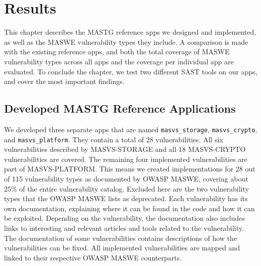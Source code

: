 \chapter{Results}
\label{c:results}

This chapter describes the MASTG reference apps we designed and implemented, as well as the MASWE vulnerability types they include. A comparison is made with the existing reference apps, and both the total coverage of MASWE vulnerability types across all apps and the coverage per individual app are evaluated. To conclude the chapter, we test two different SAST tools on our apps, and cover the most important findings.

\section{Developed MASTG Reference Applications}

We developed three separate apps that are named \texttt{masvs\_storage}, \texttt{masvs\_crypto}, and \texttt{masvs\_platform}. They contain a total of 28 vulnerabilities. All six vulnerabilities described by MASVS-STORAGE and all 18 MASVS-CRYPTO vulnerabilities are covered. The remaining four implemented vulnerabilities are part of MASVS-PLATFORM. This means we created implementations for 28 out of 115 vulnerability types as documented by OWASP MASWE, covering about 25\% of the entire vulnerability catalog. Excluded here are the two vulnerability types that the OWASP MASWE lists as deprecated. Each vulnerability has its own documentation, explaining where it can be found in the code and how it can be exploited. Depending on the vulnerability, the documentation also includes links to interesting and relevant articles and tools related to the vulnerability. The documentation of some vulnerabilities contains descriptions of how the vulnerabilities can be fixed. All implemented vulnerabilities are mapped and linked to their respective OWASP MASWE counterparts.

